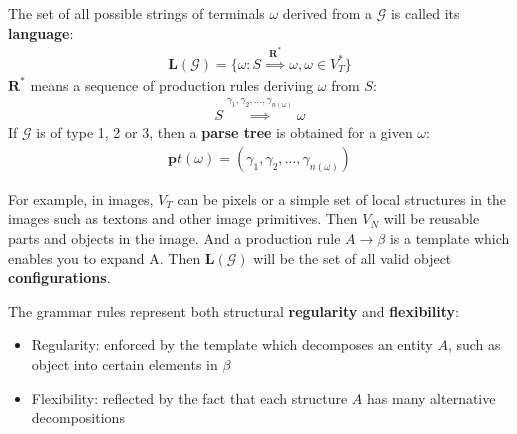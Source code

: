 \documentclass[10pt,oneside]{book}
\begin{document}
The set of all possible strings of terminals $\omega$ derived from a
$\mathcal{G}$ is called its \textbf{language}:
%
\begin{align}
  \label{eq:1.3}
  \mathbf{L}(\mathcal{G}) = \{\omega: S \overset{\mathbf{R^*}}{\implies} \omega, \omega \in V^*_T\}
\end{align}
%
$\mathbf{R^*}$ means a sequence of production rules deriving $\omega$ from $S$:
%
\begin{align}
  \label{eq:1.4}
  S \overset{\gamma_1, \gamma_2, \ldots, \gamma_{n(\omega)}}{\implies} \omega
\end{align}
%
If $\mathcal{G}$ is of type 1, 2 or 3, then a \textbf{parse tree} is obtained
for a given $\omega$:
%
\begin{align}
  \label{eq:1.5}
  \mathbf{p}t(\omega) = (\gamma_1, \gamma_2, \ldots, \gamma_{n(\omega)})
\end{align}
%

For example, in images, $V_T$ can be pixels or a simple set of local structures
in the images such as textons and other image primitives. Then $V_N$ will be
reusable parts and objects in the image. And a production rule
$A \rightarrow \beta$ is a template which enables you to expand A. Then
$\mathbf{L}(\mathcal{G})$ will be the set of all valid object
\textbf{configurations}.

The grammar rules represent both structural \textbf{regularity} and
\textbf{flexibility}:
%
\begin{itemize}
  \item Regularity: enforced by the template which decomposes an entity $A$,
    such as object into certain elements in $\beta$
  \item Flexibility: reflected by the fact that each structure $A$ has many
    alternative decompositions
\end{itemize}
%
\end{document}
